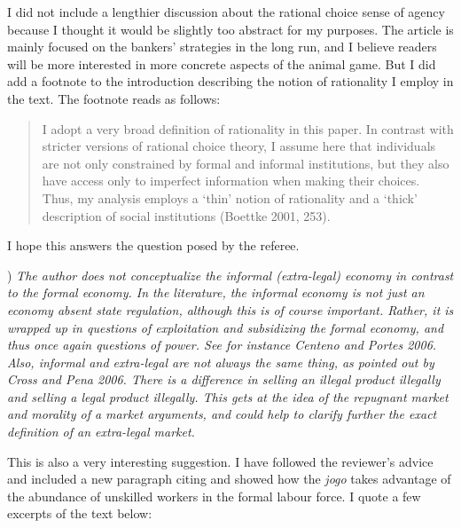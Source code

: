 \documentclass[a4paper,12pt]{article}
\begin{document}
I did not include a lengthier discussion about the rational choice sense of agency because I thought it would be slightly too abstract for my purposes. The article is mainly focused on the bankers' strategies in the long run, and I believe readers will be more interested in more concrete aspects of the animal game. But I did add a footnote to the introduction describing the notion of rationality I employ in the text. The footnote reads as follows: 

\begin{quote}
	I adopt a very broad definition of rationality in this paper. In contrast with stricter versions of rational choice theory, I assume here that individuals are not only constrained by formal and informal institutions, but they also have access only to imperfect information when making their choices. Thus, my analysis employs a ‘thin’ notion of rationality and a ‘thick’ description of social institutions (Boettke 2001, 253).
\end{quote}

I hope this answers the question posed by the referee. 

\vspace{.5cm}

) \textit{The author does not conceptualize the informal (extra-legal) economy in contrast to the formal economy. In the literature, the informal economy is not just an economy absent state regulation, although this is of course important. Rather, it is wrapped up in questions of exploitation and subsidizing the formal economy, and thus once again questions of power. See for instance Centeno and Portes 2006. Also, informal and extra-legal are not always the same thing, as pointed out by Cross and Pena 2006. There is a difference in selling an illegal product illegally and selling a legal product illegally. This gets at the idea of the repugnant market and morality of a market arguments, and could help to clarify further the exact definition of an extra-legal market.}

\vspace{.25cm}

This is also a very interesting suggestion. I have followed the reviewer's advice and included a new paragraph citing \citet{cross2006risk} and showed how the \textit{jogo} takes advantage of the abundance of unskilled workers in the formal labour force. I quote a few excerpts of the text below: 
\end{document}
